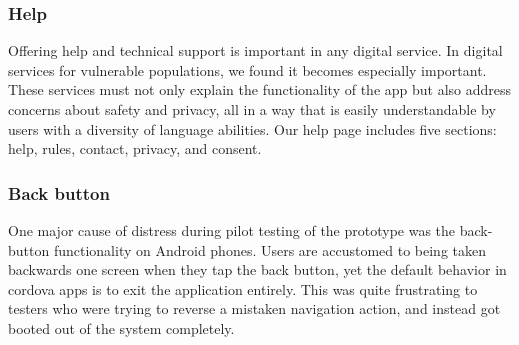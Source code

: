 
\subsubsection*{Help}

Offering help and technical support is important in any digital service. In digital services for vulnerable populations, we found it becomes especially important. These services must not only explain the functionality of the app but also address concerns about safety and privacy, all in a way that is easily understandable by users with a diversity of language abilities. Our help page includes five sections: help, rules, contact, privacy, and consent.



\subsubsection*{Back button}

One major cause of distress during pilot testing of the prototype was the back-button functionality on Android phones. Users are accustomed to being taken backwards one screen when they tap the back button, yet the default behavior in cordova apps is to exit the application entirely. This was quite frustrating to testers who were trying to reverse a mistaken navigation action, and instead got booted out of the system completely.

